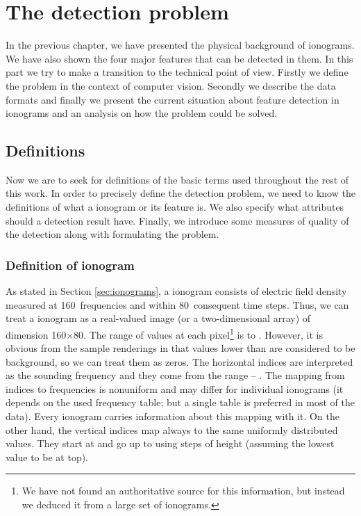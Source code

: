 \chapter{The detection problem}
In the previous chapter, we have presented the physical background of ionograms. We have also shown the four major features that can be detected in them. In this part we try to make a transition to the technical point of view. Firstly we define the problem in the context of computer vision. Secondly we describe the data formats and finally we present the current situation about feature detection in ionograms and an analysis on how the problem could be solved.

\section{Definitions}
Now we are to seek for definitions of the basic terms used throughout the rest of this work. In order to precisely define the detection problem, we need to know the definitions of what a ionogram or its feature is. We also specify what attributes should a detection result have. Finally, we introduce some measures of quality of the detection along with formulating the problem.

\subsection{Definition of ionogram}
As stated in Section \ref{sec:ionograms}, a ionogram consists of electric field density measured at 160~frequencies and within 80~consequent time steps. Thus, we can treat a ionogram as a real-valued image (or a two-dimensional array) of dimension 160$\times$80. The range of values at each pixel\footnote{We have not found an authoritative source for this information, but instead we deduced it from a large set of ionograms.} is  to . However, it is obvious from the sample renderings in \citep{FTP} that values lower than  are considered to be background, so we can treat them as zeros. The horizontal indices are interpreted as the sounding frequency and they come from the range  -- . The mapping from indices to frequencies is nonuniform and may differ for individual ionograms (it depends on the used frequency table; but a single table is preferred in most of the data). Every ionogram carries information about this mapping with it. On the other hand, the vertical indices map always to the same uniformly distributed values. They start at  and go up to  using steps of height  (assuming the lowest value to be at top).

